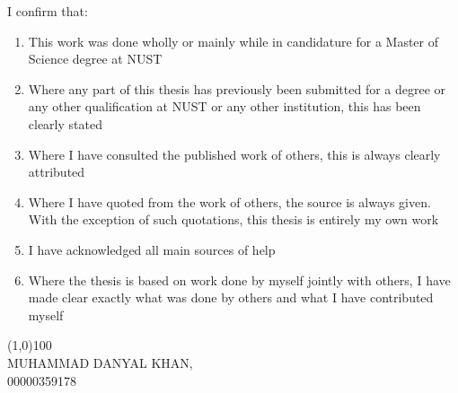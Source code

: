     I confirm that:
    \begin{enumerate}
        \item This work was done wholly or mainly while in candidature for a Master of Science degree at NUST
        \item Where any part of this thesis has previously been submitted for a degree or any other qualification at NUST or any other institution, this has been clearly stated
        \item Where I have consulted the published work of others, this is always clearly attributed
        \item Where I have quoted from the work of others, the source is always given. With the exception of such quotations, this thesis is entirely my own work
        \item I have acknowledged all main sources of help
        \item Where the thesis is based on work done by myself jointly with others, I have made clear exactly what was done by others and what I have contributed myself
    \end{enumerate}

    \begin{flushright}
        \line(1,0){100} \\
        MUHAMMAD DANYAL KHAN, \\
        00000359178
    \end{flushright}